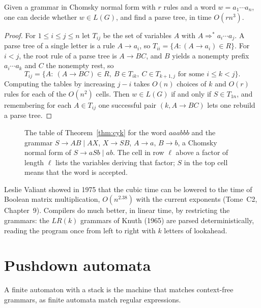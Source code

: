\begin{theorem}\label{thm:cyk}
Given a grammar in Chomsky normal form with $r$ rules and a word $w=a_1\cdots a_n$, one can decide whether $w\in L(G)$, and find a parse tree, in time $O(rn^3)$.
\end{theorem}

\begin{proof}
For $1\le i\le j\le n$ let $T_{ij}$ be the set of variables $A$ with $A\Rightarrow^*a_i\cdots a_j$. A parse tree of a single letter is a rule $A\to a_i$, so $T_{ii}=\{A:(A\to a_i)\in R\}$. For $i<j$, the root rule of a parse tree is $A\to BC$, and $B$ yields a nonempty prefix $a_i\cdots a_k$ and $C$ the nonempty rest, so
\[
T_{ij}=\{A:\ (A\to BC)\in R,\ B\in T_{ik},\ C\in T_{k+1,j}\text{ for some }i\le k<j\}.
\]
Computing the tables by increasing $j-i$ takes $O(n)$ choices of $k$ and $O(r)$ rules for each of the $O(n^2)$ cells. Then $w\in L(G)$ if and only if $S\in T_{1n}$, and remembering for each $A\in T_{ij}$ one successful pair $(k,A\to BC)$ lets one rebuild a parse tree.
\end{proof}

\begin{figure}[ht]
\centering
{}
\caption{The table of Theorem~\ref{thm:cyk} for the word $aaabbb$ and the grammar $S\to AB\mid AX$, $X\to SB$, $A\to a$, $B\to b$, a Chomsky normal form of $S\to aSb\mid ab$. The cell in row $\ell$ above a factor of length $\ell$ lists the variables deriving that factor; $S$ in the top cell means that the word is accepted.}
\label{fig:cyk}
\end{figure}

Leslie Valiant showed in 1975 that the cubic time can be lowered to the time of Boolean matrix multiplication, $O(n^{2.38})$ with the current exponents (Tome~C2, Chapter~9). Compilers do much better, in linear time, by restricting the grammars: the $LR(k)$ grammars of Knuth (1965) are parsed deterministically, reading the program once from left to right with $k$ letters of lookahead.

\section{Pushdown automata}\label{sec:pda}

A finite automaton with a stack is the machine that matches context-free grammars, as finite automata match regular expressions.

